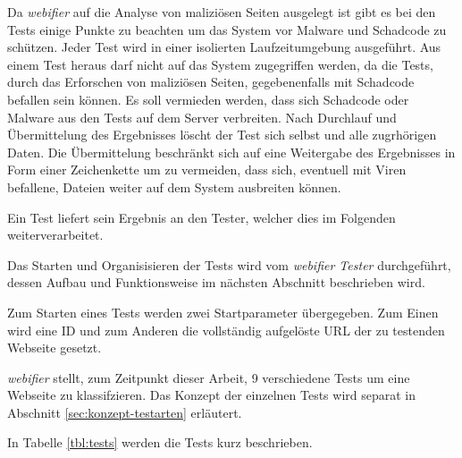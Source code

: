 Da \textit{webifier} auf die Analyse von maliziösen Seiten ausgelegt ist gibt es bei den Tests
einige Punkte zu beachten um das System vor Malware und Schadcode zu schützen.
Jeder Test wird in einer isolierten Laufzeitumgebung ausgeführt. Aus einem Test
heraus darf nicht auf das System zugegriffen werden, da die Tests, durch das Erforschen von
maliziösen Seiten, gegebenenfalls mit Schadcode befallen sein können. Es soll vermieden werden,
dass sich Schadcode oder Malware aus den Tests auf dem Server verbreiten. Nach Durchlauf und
Übermittelung des Ergebnisses löscht der Test sich selbst und alle zugrhörigen Daten. Die
Übermittelung beschränkt sich auf eine Weitergabe des Ergebnisses in Form einer Zeichenkette um zu
vermeiden, dass sich, eventuell mit Viren befallene, Dateien weiter auf dem System ausbreiten
können.

Ein Test liefert sein Ergebnis an den Tester, welcher dies im Folgenden weiterverarbeitet.

Das Starten und Organisisieren der Tests wird vom \textit{webifier Tester} durchgeführt, dessen
Aufbau und Funktionsweise im nächsten Abschnitt beschrieben wird.

Zum Starten eines Tests werden zwei Startparameter übergegeben. Zum Einen wird eine ID und zum
Anderen die vollständig aufgelöste URL der zu testenden Webseite gesetzt.

\textit{webifier} stellt, zum Zeitpunkt dieser Arbeit, 9 verschiedene Tests um eine Webseite zu
klassifzieren.
Das Konzept der einzelnen Tests wird separat in Abschnitt
\ref{sec:konzept-testarten} erläutert.

In Tabelle \ref{tbl:tests} werden die Tests kurz beschrieben.

